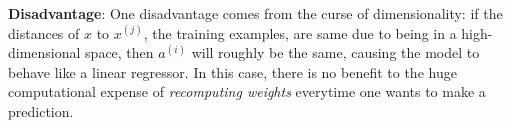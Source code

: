 \documentclass{article}
\begin{document}
\begin{enumerate}[(a)]
    \textbf{Disadvantage}:  One disadvantage comes from the curse of dimensionality: if the distances of $x$ to $x^{(j)}$, the training examples, are same due to being in a high-dimensional space, then $a^{(i)}$ will roughly be the same, causing the model to behave like a linear regressor. In this case, there is no benefit to the huge computational expense of \textit{recomputing weights} everytime one wants to make a prediction.
\end{enumerate}
\end{document}
